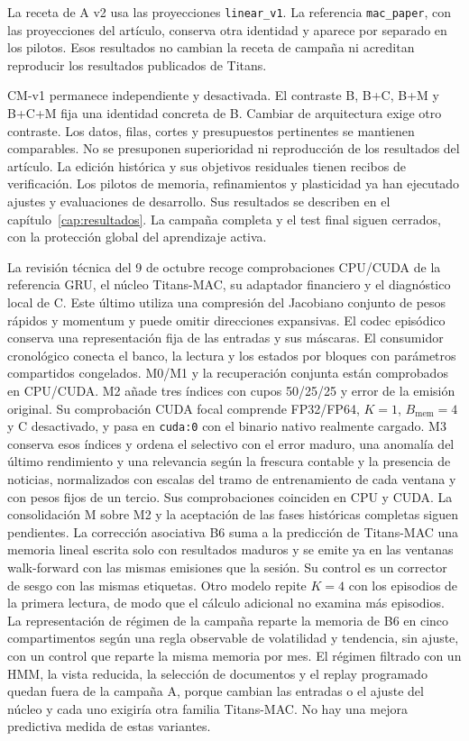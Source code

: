 \documentclass[11pt,a4paper]{report}
\begin{document}
La receta de A v2 usa las proyecciones \texttt{linear\_v1}. La referencia
\texttt{mac\_paper}, con las proyecciones del artículo, conserva otra identidad
y aparece por separado en los pilotos. Esos resultados no cambian la receta de
campaña ni acreditan reproducir los resultados publicados de Titans.

CM-v1 permanece independiente y desactivada. El contraste B, B+C, B+M y B+C+M
fija una identidad concreta de B. Cambiar de arquitectura exige otro contraste.
Los datos, filas, cortes y presupuestos pertinentes se mantienen comparables.
No se presuponen superioridad ni reproducción de los resultados del artículo.
La edición histórica y sus objetivos residuales tienen recibos de verificación.
Los pilotos de memoria, refinamientos y plasticidad ya han ejecutado ajustes y
evaluaciones de desarrollo. Sus resultados se describen en el
capítulo~\ref{cap:resultados}. La campaña completa y el test final siguen
cerrados, con la protección global del aprendizaje activa.

La revisión técnica del 9 de octubre recoge comprobaciones CPU/CUDA de la referencia GRU,
el núcleo Titans-MAC, su adaptador financiero y el diagnóstico local de C.
Este último utiliza una compresión del Jacobiano conjunto de pesos rápidos
y momentum y puede omitir direcciones expansivas. El codec episódico conserva
una representación fija de las entradas y sus máscaras. El consumidor
cronológico conecta el banco, la lectura y los estados por bloques con
parámetros compartidos congelados. M0/M1 y la recuperación conjunta están
comprobados en CPU/CUDA. M2 añade tres índices con cupos 50/25/25 y error de la
emisión original. Su comprobación CUDA focal comprende FP32/FP64, $K=1$,
$B_{\mathrm{mem}}=4$ y C desactivado, y pasa en \texttt{cuda:0} con el binario
nativo realmente cargado. M3 conserva esos índices y ordena el selectivo con
el error maduro, una anomalía del último rendimiento y una relevancia según la
frescura contable y la presencia de noticias, normalizados con escalas del
tramo de entrenamiento de cada ventana y con pesos fijos de un tercio. Sus
comprobaciones coinciden en CPU y CUDA. La consolidación M sobre M2 y la
aceptación de las fases históricas completas siguen pendientes. La corrección
asociativa B6 suma a la predicción de Titans-MAC una memoria lineal escrita
solo con resultados maduros y se emite ya en las ventanas walk-forward con las
mismas emisiones que la sesión. Su control es un corrector de sesgo con las
mismas etiquetas. Otro modelo repite $K=4$ con los episodios de la primera
lectura, de modo que el cálculo adicional no examina más episodios. La
representación de régimen de la campaña reparte la memoria de B6 en cinco
compartimentos según una regla observable de volatilidad y tendencia, sin
ajuste, con un control que reparte la misma memoria por mes. El régimen
filtrado con un HMM, la vista reducida, la selección de documentos y el replay
programado quedan fuera de la campaña A, porque cambian las entradas o el ajuste del
núcleo y cada uno exigiría otra familia Titans-MAC. No hay una mejora
predictiva medida de estas variantes.
\end{document}
